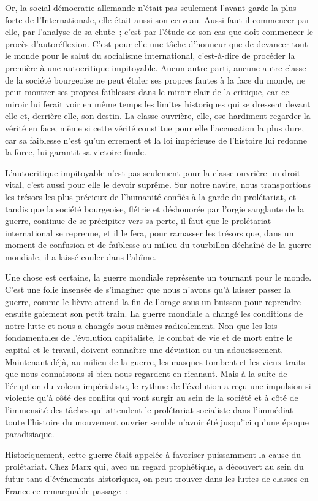 \documentclass[french,twoside]{book} %
\begin{document}
Or, la social-démocratie allemande n’était pas seulement l’avant-garde la plus forte de l’Internationale, elle était aussi son cerveau. Aussi faut-il commencer par elle, par l’analyse de sa chute ; c’est par l’étude de son cas que doit commencer le procès d’autoréflexion. C'est pour elle une tâche d’honneur que de devancer tout le monde pour le salut du socialisme international, c’est-à-dire de procéder  la première à une autocritique impitoyable. Aucun autre parti, aucune autre classe de la société bourgeoise ne peut étaler ses propres fautes à la face du monde, ne peut montrer ses propres faiblesses dans le miroir clair de la critique, car ce miroir lui ferait voir en même temps les limites historiques qui se dressent devant elle et, derrière elle, son destin. La classe ouvrière, elle, ose hardiment regarder la vérité en face, même si cette vérité constitue pour elle l’accusation la plus dure, car sa faiblesse n’est qu’un errement et la loi impérieuse de l’histoire lui redonne la force, lui garantit sa victoire finale.\par
L'autocritique impitoyable n’est pas seulement pour la classe ouvrière un droit vital, c’est aussi pour elle le devoir suprême. Sur notre navire, nous transportions les trésors les plus précieux de l’humanité confiés à la garde du prolétariat, et tandis que la société bourgeoise, flétrie et déshonorée par l’orgie sanglante de la guerre, continue de se précipiter vers sa perte, il faut que le prolétariat international se reprenne, et il le fera, pour ramasser les trésors que, dans un moment de confusion et de faiblesse au milieu du tourbillon déchaîné de la guerre mondiale, il a laissé couler dans l’abîme.\par
Une chose est certaine, la guerre mondiale représente un tournant pour le monde. C'est une folie insensée de s’imaginer que nous n’avons qu’à laisser passer la guerre, comme le lièvre attend la fin de l’orage sous un buisson pour reprendre ensuite gaiement son petit train. La guerre mondiale a changé les conditions de notre lutte et nous a changés nous-mêmes radicalement. Non que les lois fondamentales de l’évolution capitaliste, le combat de vie et de mort entre le capital et le travail, doivent connaître une déviation ou un adoucissement. Maintenant déjà, au milieu de la guerre, les masques tombent et les vieux traits que nous connaissons si bien nous regardent en ricanant. Mais à la suite de l’éruption du volcan impérialiste, le rythme de l’évolution a reçu une impulsion si violente qu’à côté des conflits qui vont surgir au sein de la société et à côté de l’immensité des tâches qui attendent le prolétariat socialiste dans l’immédiat toute l’histoire du mouvement ouvrier semble n’avoir été jusqu’ici qu’une époque paradisiaque.\par
Historiquement, cette guerre était appelée à favoriser puissamment la cause du prolétariat. Chez Marx qui, avec un regard prophétique, a découvert au sein du futur tant d’événements historiques, on peut trouver dans les luttes de classes en France ce remarquable passage :\par
\end{document}
